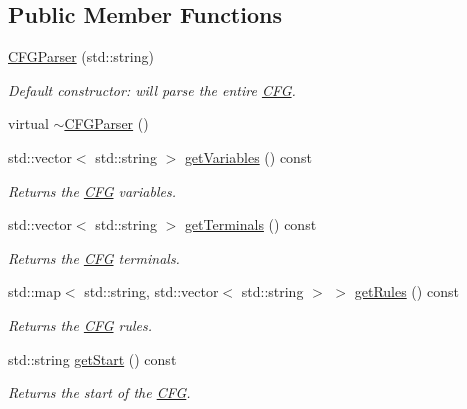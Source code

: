 \subsection*{\-Public \-Member \-Functions}
\begin{DoxyCompactItemize}
\item 
\hyperlink{classCFGParser_ab92c03dd2a8d901fb38b468c97ee879d}{\-C\-F\-G\-Parser} (std\-::string)
\begin{DoxyCompactList}\small\item\em \-Default constructor\-: will parse the entire \hyperlink{classCFG}{\-C\-F\-G}. \end{DoxyCompactList}\item 
virtual \hyperlink{classCFGParser_a52b7730ad87bfb47fcc100dc6b2756ee}{$\sim$\-C\-F\-G\-Parser} ()
\item 
std\-::vector$<$ std\-::string $>$ \hyperlink{classCFGParser_a91c3dfa2ce514b1066eb4d86af311804}{get\-Variables} () const 
\begin{DoxyCompactList}\small\item\em \-Returns the \hyperlink{classCFG}{\-C\-F\-G} variables. \end{DoxyCompactList}\item 
std\-::vector$<$ std\-::string $>$ \hyperlink{classCFGParser_aef1d5758fe648f2ab93220816bdd9a84}{get\-Terminals} () const 
\begin{DoxyCompactList}\small\item\em \-Returns the \hyperlink{classCFG}{\-C\-F\-G} terminals. \end{DoxyCompactList}\item 
std\-::map$<$ std\-::string, \*
std\-::vector$<$ std\-::string $>$ $>$ \hyperlink{classCFGParser_abf6237f25b52dd05009220a8d10c3449}{get\-Rules} () const 
\begin{DoxyCompactList}\small\item\em \-Returns the \hyperlink{classCFG}{\-C\-F\-G} rules. \end{DoxyCompactList}\item 
std\-::string \hyperlink{classCFGParser_af4336389c220320c7d9511fffafddfae}{get\-Start} () const 
\begin{DoxyCompactList}\small\item\em \-Returns the start of the \hyperlink{classCFG}{\-C\-F\-G}. \end{DoxyCompactList}\end{DoxyCompactItemize}

